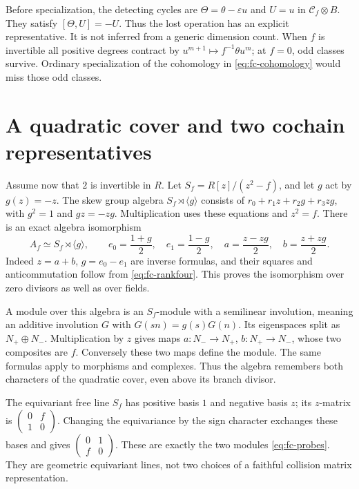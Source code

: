 Before specialization, the detecting cycles are
\(\Theta=\theta-\varepsilon u\) and \(U=u\) in
\(\mathcal C_f\otimes B\). They satisfy
\([\Theta,U]=-U\). Thus the lost operation has an explicit
representative. It is not inferred from a generic dimension count.
When \(f\) is invertible all positive degrees contract by
\(u^{m+1}\mapsto f^{-1}\theta u^m\); at \(f=0\), odd classes
survive. Ordinary specialization of the cohomology in
\eqref{eq:fc-cohomology} would miss those odd classes.

\section{A quadratic cover and two cochain representatives}

Assume now that \(2\) is invertible in \(R\). Let
\(S_f=R[z]/(z^2-f)\), and let \(g\) act by \(g(z)=-z\).
The skew group algebra \(S_f\rtimes\langle g\rangle\) consists
of \(r_0+r_1z+r_2g+r_3zg\), with \(g^2=1\) and
\(gz=-zg\). Multiplication uses these equations and \(z^2=f\).
There is an exact algebra isomorphism
\begin{equation}\label{eq:fc-root}
 A_f\simeq S_f\rtimes\langle g\rangle,\qquad
 e_0=\frac{1+g}{2},\quad e_1=\frac{1-g}{2},\quad
 a=\frac{z-zg}{2},\quad b=\frac{z+zg}{2}.
\end{equation}
Indeed \(z=a+b\), \(g=e_0-e_1\) are inverse formulas, and their
squares and anticommutation follow from \eqref{eq:fc-rankfour}.
This proves the isomorphism over zero divisors as well as over fields.

A module over this algebra is an \(S_f\)-module with a semilinear
involution, meaning an additive involution \(G\) with
\(G(sn)=g(s)G(n)\). Its eigenspaces split as \(N_+\oplus N_-\).
Multiplication by \(z\) gives maps \(a:N_-\to N_+\),
\(b:N_+\to N_-\), whose two composites are \(f\).
Conversely these two maps define the module. The same formulas apply
to morphisms and complexes. Thus the algebra remembers both characters
of the quadratic cover, even above its branch divisor.

The equivariant free line \(S_f\) has positive basis \(1\) and
negative basis \(z\); its \(z\)-matrix is
\(\left(\begin{smallmatrix}0&f\\1&0\end{smallmatrix}\right)\).
Changing the equivariance by the sign character exchanges these bases
and gives \(\left(\begin{smallmatrix}0&1\\f&0\end{smallmatrix}\right)\).
These are exactly the two modules \eqref{eq:fc-probes}. They are
geometric equivariant lines, not two choices of a faithful collision
matrix representation.


